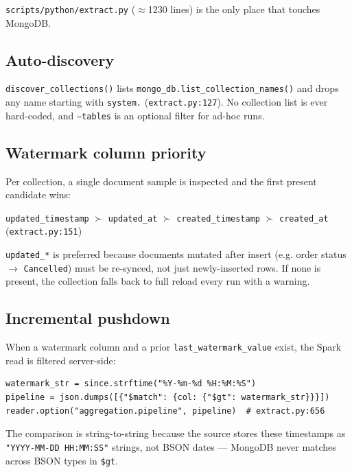 \documentclass[11pt,a4paper]{article}
\begin{document}
\texttt{scripts/python/extract.py} ($\approx$1230 lines) is the only place that touches MongoDB.

\subsection{Auto-discovery}
\texttt{discover\_collections()} lists \texttt{mongo\_db.list\_collection\_names()} and drops any name starting with \texttt{system.} (\texttt{extract.py:127}). No collection list is ever hard-coded, and \texttt{--tables} is an optional filter for ad-hoc runs.

\subsection{Watermark column priority}
Per collection, a single document sample is inspected and the first present candidate wins:
\begin{center}
\texttt{updated\_timestamp} $\succ$ \texttt{updated\_at} $\succ$ \texttt{created\_timestamp} $\succ$ \texttt{created\_at} \quad (\texttt{extract.py:151})
\end{center}
\texttt{updated\_*} is preferred because documents mutated after insert (e.g. order status $\rightarrow$ \texttt{Cancelled}) must be re-synced, not just newly-inserted rows. If none is present, the collection falls back to full reload every run with a warning.

\subsection{Incremental pushdown}
When a watermark column and a prior \texttt{last\_watermark\_value} exist, the Spark read is filtered server-side:
\begin{lstlisting}[style=py,caption={Pushdown filter — string comparison is intentional}]
watermark_str = since.strftime("%Y-%m-%d %H:%M:%S")
pipeline = json.dumps([{"$match": {col: {"$gt": watermark_str}}}])
reader.option("aggregation.pipeline", pipeline)  # extract.py:656
\end{lstlisting}
The comparison is string-to-string because the source stores these timestamps as \texttt{"YYYY-MM-DD HH:MM:SS"} strings, not BSON dates — MongoDB never matches across BSON types in \texttt{\$gt}.
\end{document}
